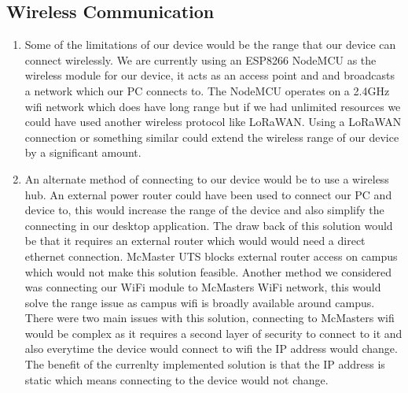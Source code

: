 \documentclass[12pt, titlepage]{article}
\begin{document}
\subsection{Wireless Communication}
\begin{enumerate}
  \item Some of the limitations of our device would be the range that our device can connect wirelessly. We are currently using an ESP8266 NodeMCU as the wireless module for our device, it acts as an access point and and broadcasts a network which our PC connects to. The NodeMCU operates on a 2.4GHz wifi network which does have long range but if we had unlimited resources we could have used another wireless protocol like LoRaWAN. Using a LoRaWAN connection or something similar could extend the wireless range of our device by a significant amount.
  \item An alternate method of connecting to our device would be to use a wireless hub. An external power router could have been used to connect our PC and device to, this would increase the range of the device and also simplify the connecting in our desktop application. The draw back of this solution would be that it requires an external router which would would need a direct ethernet connection. McMaster UTS blocks external router access on campus which would not make this solution feasible. Another method we considered was connecting our WiFi module to McMasters WiFi network, this would solve the range issue as campus wifi is broadly available around campus. There were two main issues with this solution, connecting to McMasters wifi would be complex as it requires a second layer of security to connect to it and also everytime the device would connect to wifi the IP address would change. The benefit of the currenlty implemented solution is that the IP address is static which means connecting to the device would not change. 
  
\end{enumerate}
\end{document}
